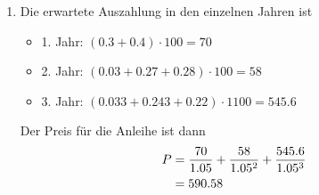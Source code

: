\documentclass{article}
\begin{document}
\begin{enumerate}[label=(\alph*)]
		\item Die erwartete Auszahlung in den einzelnen Jahren ist
		\begin{itemize}
			\item 1. Jahr: $(0.3 + 0.4)\cdot 100 = 70$
			\item 2. Jahr: $(0.03 + 0.27 + 0.28)\cdot 100 = 58$
			\item 3. Jahr: $(0.033 + 0.243 + 0.22)\cdot 1100 = 545.6$
		\end{itemize}
		Der Preis für die Anleihe ist dann
		\begin{align}
			P &= \frac{70}{1.05} + \frac{58}{1.05^2} + \frac{545.6}{1.05^3} \notag \\
			&= 590.58 \notag
		\end{align}
	\end{enumerate}
	
	
\end{document}
